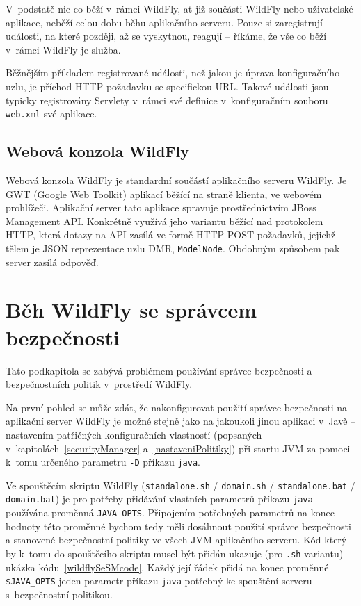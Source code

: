 V~podstatě nic co běží v~rámci WildFly, ať již součásti WildFly nebo uživatelské aplikace, neběží celou dobu běhu aplikačního serveru.
Pouze si zaregistrují události, na které později, až se vyskytnou, reagují -- říkáme, že vše co běží v~rámci WildFly je služba.~\cite{jboss7slideShare}

Běžnějším příkladem registrované události, než jakou je úprava konfiguračního uzlu, je příchod HTTP požadavku se specifickou URL.
Takové události jsou typicky registrovány Servlety v~rámci své definice v~konfiguračním souboru {\tt web.xml} své aplikace.
\cite{jboss7slideShare}

\subsection{Webová konzola WildFly} \label{hal}

Webová konzola WildFly je standardní součástí aplikačního serveru WildFly.
Je GWT (Google Web Toolkit) aplikací běžící na straně klienta, ve webovém prohlížeči.
Aplikační server tato aplikace spravuje prostřednictvím JBoss Management API.
Konkrétně využívá jeho variantu běžící nad protokolem HTTP, která dotazy na API zasílá ve formě HTTP POST požadavků, jejichž tělem je JSON reprezentace uzlu DMR, {\tt ModelNode}. Obdobným způsobem pak server zasílá odpověď.
\cite{WildFlyManagementAPIreference}

\section{Běh WildFly se správcem bezpečnosti} \label{wildflySeSM}

Tato podkapitola se zabývá problémem používání správce bezpečnosti a bezpečnostních politik v~prostředí WildFly.

Na první pohled se může zdát, že nakonfigurovat použití správce bezpečnosti na aplikační server WildFly je možné stejně jako na jakoukoli jinou aplikaci v~Javě -- nastavením patřičných konfiguračních vlastností (popsaných v~kapitolách~\ref{securityManager} a~\ref{nastaveniPolitiky}) při startu JVM za pomoci k~tomu určeného parametru {\tt -D} příkazu {\tt java}.

Ve spouštěcím skriptu WildFly ({\tt standalone.sh} / {\tt domain.sh} / {\tt standalone.bat} / {\tt domain.bat}) je pro potřeby přidávání vlastních parametrů příkazu {\tt java} používána proměnná {\tt JAVA\_OPTS}.
Připojením potřebných parametrů na konec hodnoty této proměnné bychom tedy měli dosáhnout použití správce bezpečnosti a stanovené bezpečnostní politiky ve všech JVM aplikačního serveru.
Kód který by k~tomu do spouštěcího skriptu musel být přidán ukazuje (pro {\tt *.sh} variantu) ukázka kódu~\ref{wildflySeSMcode}.
Každý její řádek přidá na konec proměnné {\tt \$JAVA\_OPTS} jeden parametr příkazu {\tt java} potřebný ke spouštění serveru s~bezpečnostní politikou.
\cite{jbossSecurityManager}

